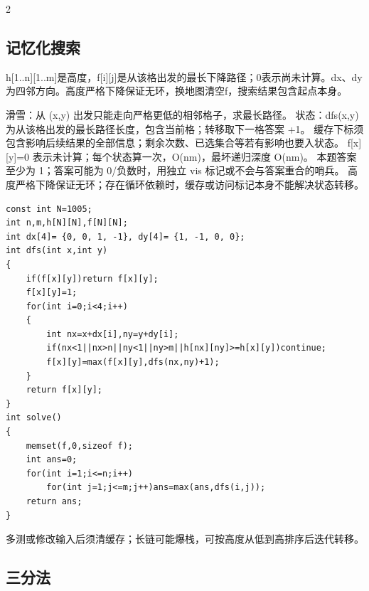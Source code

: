 \documentclass[UTF8,fontset=fandol,a4paper,twoside]{ctexart}
\newcommand{\note}[1]{{\fontsize{10}{12}\selectfont #1\par}}
\begin{document}
\begin{multicols}{2}
\subsection{记忆化搜索}

\note{h[\allowbreak{}1.\allowbreak{}.\allowbreak{}n]\allowbreak{}[\allowbreak{}1.\allowbreak{}.\allowbreak{}m]\allowbreak{}是高度，f[\allowbreak{}i]\allowbreak{}[\allowbreak{}j]\allowbreak{}是从该格出发的最长下降路径；0表示尚未计算。dx、dy为四邻方向。高度严格下降保证无环，换地图清空f，搜索结果包含起点本身。}
\note{滑雪：从 (\allowbreak{}x,\allowbreak{}y)\allowbreak{} 出发只能走向严格更低的相邻格子，求最长路径。 状态：dfs(\allowbreak{}x,\allowbreak{}y)\allowbreak{} 为从该格出发的最长路径长度，包含当前格；转移取下一格答案 +\allowbreak{}1。 缓存下标须包含影响后续结果的全部信息；剩余次数、已选集合等若有影响也要入状态。 f[\allowbreak{}x]\allowbreak{}[\allowbreak{}y]\allowbreak{}=\allowbreak{}0 表示未计算；每个状态算一次，O(\allowbreak{}nm)\allowbreak{}，最坏递归深度 O(\allowbreak{}nm)\allowbreak{}。 本题答案至少为 1；答案可能为 0/\allowbreak{}负数时，用独立 vis 标记或不会与答案重合的哨兵。 高度严格下降保证无环；存在循环依赖时，缓存或访问标记本身不能解决状态转移。}
\begin{lstlisting}
const int N=1005;
int n,m,h[N][N],f[N][N];
int dx[4]= {0, 0, 1, -1}, dy[4]= {1, -1, 0, 0};
int dfs(int x,int y)
{
    if(f[x][y])return f[x][y];
    f[x][y]=1;
    for(int i=0;i<4;i++)
    {
        int nx=x+dx[i],ny=y+dy[i];
        if(nx<1||nx>n||ny<1||ny>m||h[nx][ny]>=h[x][y])continue;
        f[x][y]=max(f[x][y],dfs(nx,ny)+1);
    }
    return f[x][y];
}
int solve()
{
    memset(f,0,sizeof f);
    int ans=0;
    for(int i=1;i<=n;i++)
        for(int j=1;j<=m;j++)ans=max(ans,dfs(i,j));
    return ans;
}
\end{lstlisting}
\note{多测或修改输入后须清缓存；长链可能爆栈，可按高度从低到高排序后迭代转移。}
\subsection{三分法}


\end{multicols}
\end{document}
